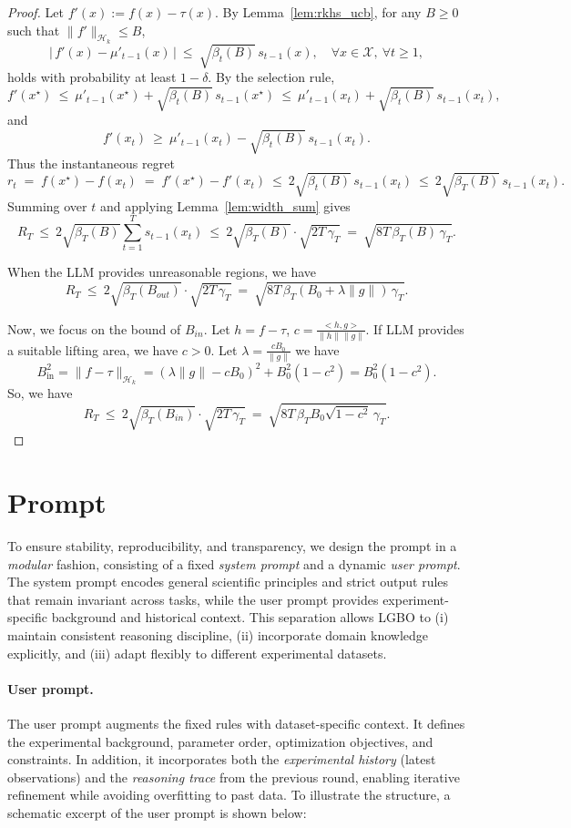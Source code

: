\documentclass{article} %
\begin{document}
\begin{proof}
Let $f'(x):=f(x)-\tau(x)$. By Lemma~\ref{lem:rkhs_ucb}, for any $B\ge 0$ such that $\|f'\|_{\mathcal H_k}\le B$,
\[
|\,f'(x)-\mu'_{t-1}(x)\,|\ \le\ \sqrt{\beta_t(B)}\, s_{t-1}(x),
\quad \forall x\in\mathcal X,\ \forall t\ge 1,
\]
holds with probability at least $1-\delta$. By the selection rule,
\[
f'(x^\star)\ \le\ \mu'_{t-1}(x^\star)+\sqrt{\beta_t(B)}\,s_{t-1}(x^\star)
\ \le\ \mu'_{t-1}(x_t)+\sqrt{\beta_t(B)}\,s_{t-1}(x_t),
\]
and
\[
f'(x_t)\ \ge\ \mu'_{t-1}(x_t)-\sqrt{\beta_t(B)}\,s_{t-1}(x_t).
\]
Thus the instantaneous regret
\[
r_t \;=\; f(x^\star)-f(x_t)\;=\; f'(x^\star)-f'(x_t)
\ \le\ 2\sqrt{\beta_t(B)}\,s_{t-1}(x_t)
\ \le\ 2\sqrt{\beta_T(B)}\,s_{t-1}(x_t).
\]
Summing over $t$ and applying Lemma~\ref{lem:width_sum} gives
\[
R_T \ \le\ 2\sqrt{\beta_T(B)}\sum_{t=1}^T s_{t-1}(x_t)
\ \le\ 2\sqrt{\beta_T(B)}\cdot \sqrt{2T\,\gamma_T}
\ =\ \sqrt{8T\,\beta_T(B)\,\gamma_T}.
\]

When the LLM provides unreasonable regions, we have 
\[R_T 
\ \le\ 2\sqrt{\beta_T(B_{out})}\cdot \sqrt{2T\,\gamma_T}
\ =\ \sqrt{8T\,\beta_T(B_0+\lambda\|g\|)\,\gamma_T}.\]

Now, we focus on the bound of $B_{in}$. Let $h=f-\tau$, $c=\frac{\big<h,g\big>}{\|h\|\|g\|}$. If LLM provides a suitable lifting area, we have $c>0$. Let $\lambda=\frac{cB_0}{\|g\|}$ we have  
\[B^2_{\mathrm{in}}=\|f-\tau\|_{\mathcal H_k}=(\lambda\|g\|-cB_0)^2+B_0^2(1-c^2)=B_0^2(1-c^2).\]
So, we have
\[R_T \ \le\ 2\sqrt{\beta_T(B_{in})}\cdot \sqrt{2T\,\gamma_T}
\ =\ \sqrt{8T\,\beta_TB_0\sqrt{1-c^2}\,\gamma_T}.\]
\end{proof}

\section{Prompt}
\label{app:prompt}
To ensure stability, reproducibility, and transparency, we design the prompt in a \emph{modular} fashion, consisting of a fixed \textit{system prompt} and a dynamic \textit{user prompt}. The system prompt encodes general scientific principles and strict output rules that remain invariant across tasks, while the user prompt provides experiment-specific background and historical context. This separation allows LGBO to (i) maintain consistent reasoning discipline, (ii) incorporate domain knowledge explicitly, and (iii) adapt flexibly to different experimental datasets.  

\paragraph{User prompt.}  
The user prompt augments the fixed rules with dataset-specific context. 
It defines the experimental background, parameter order, optimization objectives, and constraints. 
In addition, it incorporates both the \emph{experimental history} (latest observations) 
and the \emph{reasoning trace} from the previous round, enabling iterative refinement while avoiding overfitting to past data.  
To illustrate the structure, a schematic excerpt of the user prompt is shown below:  
\end{document}
